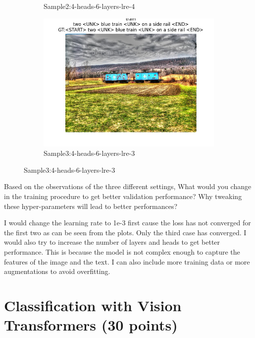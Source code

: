 \documentclass[11pt,addpoints,answers]{exam}
\numberwithin{equation}{section} %
\numberwithin{figure}{section} %
\numberwithin{table}{section} %
\begin{document}
\begin{questions}
\begin{figure}[H]
\begin{subfigure}[b]{0.32\linewidth}
        \caption{Sample2:4-heads-6-layers-lre-4}
    \end{subfigure}
    \begin{subfigure}[b]{0.32\linewidth}
        \includegraphics[width=\linewidth]{../transformer_captioning/plots 2/case3_train_1.png}
        \caption{Sample3:4-heads-6-layers-lre-3}
    \end{subfigure}
\end{figure}

\item Based on the observations of the three different settings, What would you change in the training procedure to get better validation performance? Why tweaking these hyper-parameters will lead to better performances?

\begin{solution}
    I would change the learning rate to 1e-3 first cause the loss has not converged for the first two as can be seen from the plots. Only the third case has converged. I would also try to increase the number of layers and heads to get better performance. This is because the model is not complex enough to capture the features of the image and the text. I can also include more training data or more augmentations to avoid overfitting.
\end{solution}

\end{questions}
\clearpage

\section{Classification with Vision Transformers (30 points)}
\end{document}
